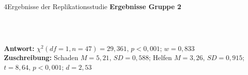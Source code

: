 \documentclass[xcolor=table,9pt,aspectratio=169]{beamer}
\begin{document}
\begin{frame}{\vspace*{10mm}4\hspace*{1em}Ergebnisse der Replikationsstudie}
\textbf{Ergebnisse Gruppe 2}\\
\begin{multicols}{2}
   \begin{center}
      \\
      \\
   \end{center}
\end{multicols}
\textbf{Antwort:} $\chi^2(df=1,n=47)=29,361$, $p<0,001$; $w=0,833$\\

\medskip
\textbf{Zuschreibung:} Schaden $M=5,21$, $SD=0,588$; Helfen $M=3,26$, $SD=0,915$; $t=8,64$, $p<0,001$; $d=2,53$
\end{frame}
\end{document}
